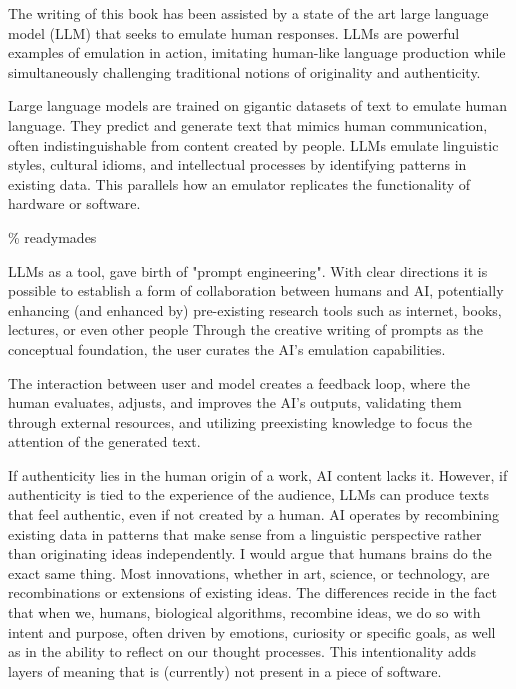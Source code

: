 The writing of this book has been assisted by a state of the art large language model (LLM) that seeks to emulate human responses. LLMs are powerful examples of emulation in action, imitating human-like language production while simultaneously challenging traditional notions of originality and authenticity. 

Large language models are trained on gigantic datasets of text to emulate human language. They predict and generate text that mimics human communication, often indistinguishable from content created by people. LLMs emulate linguistic styles, cultural idioms, and intellectual processes by identifying patterns in existing data. This parallels how an emulator replicates the functionality of hardware or software.

{\scriptsize \textcolor{comment}{\% readymades }}

LLMs as a tool, gave birth of "prompt engineering". With clear directions it is possible to establish a form of collaboration between humans and AI, potentially enhancing (and enhanced by) pre-existing research tools such as internet, books, lectures, or even other people Through the creative writing of prompts as the conceptual foundation, the user curates the AI's emulation capabilities.

The interaction between user and model creates a feedback loop, where the human evaluates, adjusts, and improves the AI's outputs, validating them through external resources, and utilizing preexisting knowledge to focus the attention of the generated text.

If authenticity lies in the human origin of a work, AI content lacks it. However, if authenticity is tied to the experience of the audience, LLMs can produce texts that feel authentic, even if not created by a human. AI operates by recombining existing data in patterns that make sense from a linguistic perspective rather than originating ideas independently. I would argue that humans brains do the exact same thing. Most innovations, whether in art, science, or technology, are recombinations or extensions of existing ideas. The differences recide in the fact that when we, humans, biological algorithms, recombine ideas, we do so with intent and purpose, often driven by emotions, curiosity or specific goals, as well as in the ability to reflect on our thought processes. This intentionality adds layers of meaning that is (currently) not present in a piece of software. 